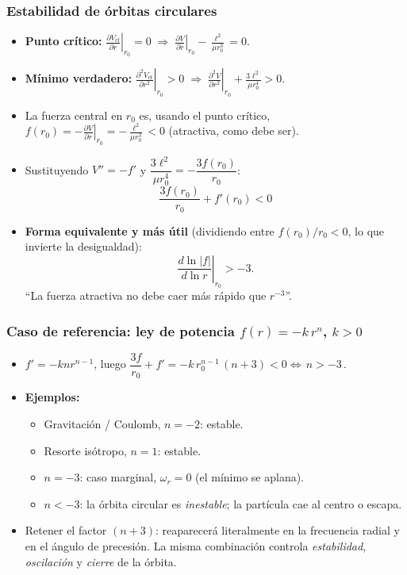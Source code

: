 \documentclass[10pt]{beamer}
\newcommand{\Vef}{V_{\mathrm{ef}}}
\begin{document}
\begin{frame}
\frametitle{Estabilidad de órbitas circulares}
\begin{itemize}
  \item<1-> \textbf{Punto crítico:}
        $\displaystyle \left.\frac{\partial\Vef}{\partial r}\right|_{r_0}=0
        \;\Rightarrow\;
        \left.\frac{\partial V}{\partial r}\right|_{r_0}
        -\frac{\ell^{2}}{\mu r_0^{3}}=0 .$
  \item<2-> \textbf{Mínimo verdadero:}
        $\displaystyle \left.\frac{\partial^{2}\Vef}{\partial r^{2}}\right|_{r_0}>0
        \;\Rightarrow\;
        \left.\frac{\partial^{2} V}{\partial r^{2}}\right|_{r_0}
        +\frac{3\ell^{2}}{\mu r_0^{4}}>0 .$
  \item<3-> La fuerza central en $r_0$ es, usando el punto crítico,
        $\displaystyle f(r_0)=-\left.\frac{\partial V}{\partial r}\right|_{r_0}
        =-\frac{\ell^{2}}{\mu r_0^{3}}<0$ (atractiva, como debe ser).
  \item<4-> Sustituyendo $V''=-f'$ y $\dfrac{3\ell^{2}}{\mu r_0^{4}}
        =-\dfrac{3f(r_0)}{r_0}$:
        \[ \boxed{\;\frac{3f(r_0)}{r_0}+f'(r_0)<0\;} \]
  \item<5-> \textbf{Forma equivalente y más útil} (dividiendo entre
        $f(r_0)/r_0<0$, \alert{lo que invierte la desigualdad}):
        \[ \left.\frac{d\ln|f|}{d\ln r}\right|_{r_0}>-3 . \]
        ``La fuerza atractiva no debe caer más rápido que $r^{-3}$''.
\end{itemize}
\end{frame}

\begin{frame}
\frametitle{Caso de referencia: ley de potencia $f(r)=-k\,r^{n}$, $k>0$}
\begin{itemize}
  \item<1-> $f'=-knr^{n-1}$, luego
        $\dfrac{3f}{r_0}+f'=-k\,r_0^{n-1}\,(n+3)<0
        \iff \boxed{\,n>-3\,}$.
  \item<2-> \textbf{Ejemplos:}
        \begin{itemize}
          \item Gravitación / Coulomb, $n=-2$: estable.
          \item Resorte isótropo, $n=1$: estable.
          \item $n=-3$: caso marginal, $\omega_r=0$ (el mínimo se aplana).
          \item $n<-3$: la órbita circular es \emph{inestable}; la partícula
                cae al centro o escapa.
        \end{itemize}
  \item<3-> \alert{Retener el factor $(n+3)$:} reaparecerá literalmente en la
        frecuencia radial y en el ángulo de precesión. La misma combinación
        controla \emph{estabilidad}, \emph{oscilación} y \emph{cierre} de la
        órbita.
\end{itemize}
\end{frame}
\end{document}
